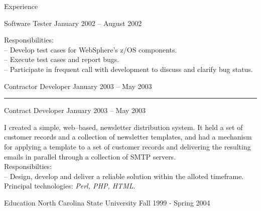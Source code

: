 \documentclass[letterpaper, 11pt]{article}
\begin{document}
\begin{resume}
\begin{category}{Experience}
\begin{block}
                \smallskip
            \end{block}
            \begin{block}
                 {Software Tester}
                         { }                {January 2002 -- August 2002}
                \par
                Responsibilities: \\
                -- Develop test cases for WebSphere's z/OS components. \\
                -- Execute test cases and report bugs. \\
                -- Participate in frequent call with development to discuss and clarify bug status.
                \bigskip
            \end{block}
             {Contractor Developer}
                     {}               {January 2003 -- May 2003}
            \rule[1ex]{\textwidth}{1pt}
            \begin{block}
                 {Contract Developer}
                         { }                              {January 2003 -- May 2003}
                \par
                I created a simple, web--based, newsletter distribution system.
                It held a set of customer records and a collection of newsletter templates,
                and had a mechanism for applying a template to a set of customer records and
                delivering the resulting emails in parallel through a collection of SMTP servers.
                \\[1ex]
                Responsibilties: \\
                -- Design, develop and deliver a reliable solution within the alloted timeframe.
                \\[1ex]
                Principal technologies: \emph{Perl, PHP, HTML}.
            \end{block}
        \end{category}
        \begin{category}{Education}
             {North Carolina State University}
                     { }                        {Fall 1999 - Spring 2004}
        \end{category}
    \end{resume}
\end{document}
